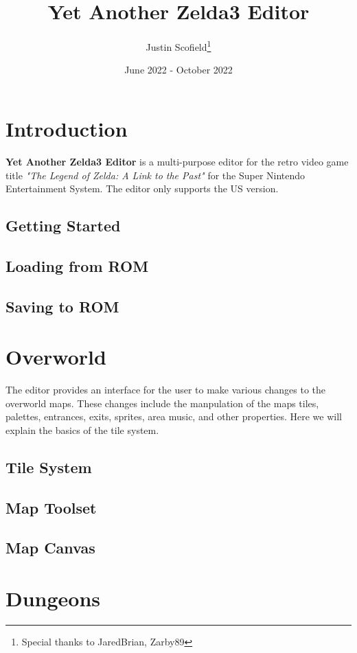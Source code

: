 \documentclass[12pt, oneside]{report}
\title{Yet Another Zelda3 Editor}
\author{Justin Scofield\thanks{Special thanks to JaredBrian, Zarby89}}
\date{June 2022 - October 2022}
\begin{document}
\maketitle

\tableofcontents

\chapter{Introduction}

{\bf Yet Another Zelda3 Editor} is a multi-purpose editor for the retro video game title {\it {"The Legend of Zelda: A Link to the Past"}} for the Super Nintendo Entertainment System. The editor only supports the US version.

\section{Getting Started}
\section{Loading from ROM}
\section{Saving to ROM}

\chapter{Overworld}

  The editor provides an interface for the user to make various changes to the overworld maps. These changes include the manpulation of the maps tiles, palettes, entrances, exits, sprites, area music, and other properties. Here we will explain the basics of the tile system.

  \section{Tile System}
  \section{Map Toolset}
  \section{Map Canvas}

\chapter{Dungeons}
\end{document}
